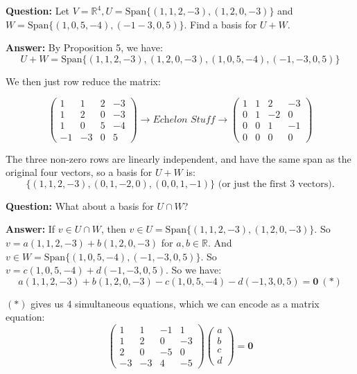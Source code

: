\documentclass[10pt]{scrartcl}
\begin{document}
\begin{examples}\item \textbf{Question:} 
 Let $V = \mathbb{R}^4, U = \text{Span}\{(1,1,2,-3),(1,2,0,-3)\}$  and\\ $W = \text{Span}\{(1,0,5,-4),(-1-3,0,5)\}.$ Find a basis for $U + W.$ 

\textbf{Answer:} By Proposition 5, we have:
 \[U + W = \text{Span}\{(1,1,2,-3),(1,2,0,-3),(1,0,5,-4),(-1,-3,0,5)\}\] 
 
 We then just row reduce the matrix:
 
 \[\begin{pmatrix}
 1 & 1 & 2 & -3\\
 1 & 2 & 0 & -3\\
 1 & 0 & 5 & -4\\
 -1 & -3 & 0 & 5
 \end{pmatrix} \rightarrow \textit{Echelon Stuff} \rightarrow
 \begin{pmatrix}
 1 & 1 & 2 & -3\\
 0 & 1 &-2 & 0\\
 0 & 0 & 1 & -1\\
 0 & 0 & 0 & 0
 \end{pmatrix}  \]

The three non-zero rows are linearly independent, and have the same span as the original four vectors, so a basis for $U + W$ is:
\[\{(1,1,2,-3),(0,1,-2,0),(0,0,1,-1)\} \text{ (or just the first 3 vectors).}\]

\item \textbf{Question:} What about a basis for $U \cap W$?

\textbf{Answer:} If $v \in U \cap W$, then $v \in U = \text{Span}\{(1,1,2,-3),(1,2,0,-3)\}.$ So $v = a(1,1,2,-3) + b(1,2,0,-3)$ for $a,b \in \mathbb{R}$. And $v \in W = \text{Span}\{(1,0,5,-4),(-1,-3,0,5)\}$. So $v = c(1,0,5,-4) + d(-1,-3,0,5)$. So we have:
\[a(1,1,2,-3) + b(1,2,0,-3) -c(1,0,5,-4) -d(-1,3,0,5) = \mathbf{0} ~(*)\]

$(*)$ gives us 4 simultaneous equations, which we can encode as a matrix equation:
\[
\begin{pmatrix}
1 & 1 & -1 & 1\\
1 & 2 & 0 & -3\\
2 & 0 & -5 & 0\\
-3 & -3 & 4 & -5
\end{pmatrix}
\begin{pmatrix}
a\\b\\c\\d
\end{pmatrix}
=
\mathbf{0} \]


\end{examples}
\end{document}
